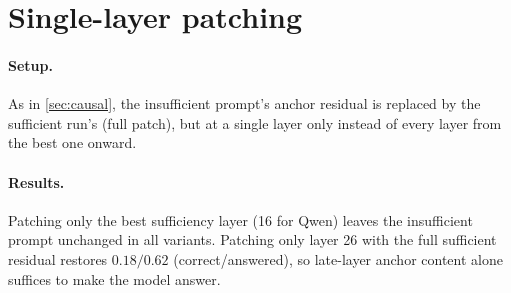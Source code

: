 \section{Single-layer patching}
\label{app:patch-single}
\paragraph{Setup.} As in \cref{sec:causal}, the insufficient prompt's anchor residual is replaced by the sufficient run's (full patch), but at a single layer only instead of every layer from the best one onward.

\paragraph{Results.} Patching only the best sufficiency layer (16 for Qwen) leaves the insufficient prompt unchanged in all variants. Patching only layer 26 with the full sufficient residual restores $0.18/0.62$ (correct/answered), so late-layer anchor content alone suffices to make the model answer.

